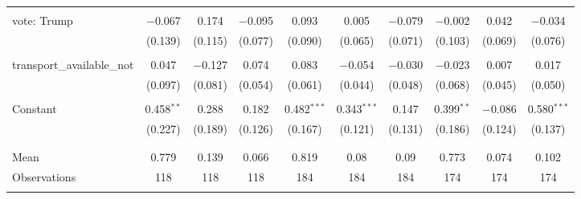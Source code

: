 \begin{tabular}{@{\extracolsep{5pt}}lccccccccc}
  & & & & & & & & & \\ 
 vote: Trump & $-$0.067 & 0.174 & $-$0.095 & 0.093 & 0.005 & $-$0.079 & $-$0.002 & 0.042 & $-$0.034 \\ 
  & (0.139) & (0.115) & (0.077) & (0.090) & (0.065) & (0.071) & (0.103) & (0.069) & (0.076) \\ 
  & & & & & & & & & \\ 
 transport\_available\_not & 0.047 & $-$0.127 & 0.074 & 0.083 & $-$0.054 & $-$0.030 & $-$0.023 & 0.007 & 0.017 \\ 
  & (0.097) & (0.081) & (0.054) & (0.061) & (0.044) & (0.048) & (0.068) & (0.045) & (0.050) \\ 
  & & & & & & & & & \\ 
 Constant & 0.458$^{**}$ & 0.288 & 0.182 & 0.482$^{***}$ & 0.343$^{***}$ & 0.147 & 0.399$^{**}$ & $-$0.086 & 0.580$^{***}$ \\ 
  & (0.227) & (0.189) & (0.126) & (0.167) & (0.121) & (0.131) & (0.186) & (0.124) & (0.137) \\ 
  & & & & & & & & & \\ 
\hline \\[-1.8ex] 
Mean & 0.779 & 0.139 & 0.066 & 0.819 & 0.08 & 0.09 & 0.773 & 0.074 & 0.102 \\ 
Observations & 118 & 118 & 118 & 184 & 184 & 184 & 174 & 174 & 174 \\ 
\hline 
\hline \\[-1.8ex] 
\end{tabular} 
